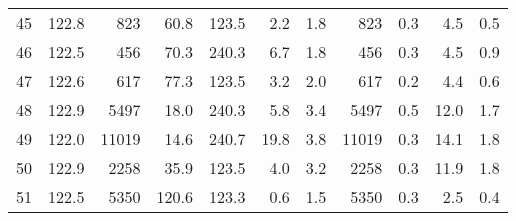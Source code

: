 \begin{tabular}{|r|rrrrr|rrrrr|}
45 & 122.8 & 823 & 60.8 & 123.5 & 2.2 & 1.8 & 823 & 0.3 & 4.5 & 0.5 \\
46 & 122.5 & 456 & 70.3 & 240.3 & 6.7 & 1.8 & 456 & 0.3 & 4.5 & 0.9 \\
47 & 122.6 & 617 & 77.3 & 123.5 & 3.2 & 2.0 & 617 & 0.2 & 4.4 & 0.6 \\
48 & 122.9 & 5497 & 18.0 & 240.3 & 5.8 & 3.4 & 5497 & 0.5 & 12.0 & 1.7 \\
49 & 122.0 & 11019 & 14.6 & 240.7 & 19.8 & 3.8 & 11019 & 0.3 & 14.1 & 1.8 \\
50 & 122.9 & 2258 & 35.9 & 123.5 & 4.0 & 3.2 & 2258 & 0.3 & 11.9 & 1.8 \\
51 & 122.5 & 5350 & 120.6 & 123.3 & 0.6 & 1.5 & 5350 & 0.3 & 2.5 & 0.4 \\
\hline
\end{tabular}
